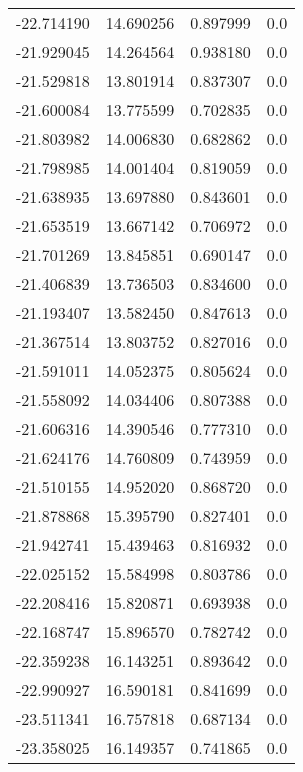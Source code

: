 \begin{tabular}{rrrr}
      -22.714190 &        14.690256 &    0.897999 &   0.0 \\
      -21.929045 &        14.264564 &    0.938180 &   0.0 \\
      -21.529818 &        13.801914 &    0.837307 &   0.0 \\
      -21.600084 &        13.775599 &    0.702835 &   0.0 \\
      -21.803982 &        14.006830 &    0.682862 &   0.0 \\
      -21.798985 &        14.001404 &    0.819059 &   0.0 \\
      -21.638935 &        13.697880 &    0.843601 &   0.0 \\
      -21.653519 &        13.667142 &    0.706972 &   0.0 \\
      -21.701269 &        13.845851 &    0.690147 &   0.0 \\
      -21.406839 &        13.736503 &    0.834600 &   0.0 \\
      -21.193407 &        13.582450 &    0.847613 &   0.0 \\
      -21.367514 &        13.803752 &    0.827016 &   0.0 \\
      -21.591011 &        14.052375 &    0.805624 &   0.0 \\
      -21.558092 &        14.034406 &    0.807388 &   0.0 \\
      -21.606316 &        14.390546 &    0.777310 &   0.0 \\
      -21.624176 &        14.760809 &    0.743959 &   0.0 \\
      -21.510155 &        14.952020 &    0.868720 &   0.0 \\
      -21.878868 &        15.395790 &    0.827401 &   0.0 \\
      -21.942741 &        15.439463 &    0.816932 &   0.0 \\
      -22.025152 &        15.584998 &    0.803786 &   0.0 \\
      -22.208416 &        15.820871 &    0.693938 &   0.0 \\
      -22.168747 &        15.896570 &    0.782742 &   0.0 \\
      -22.359238 &        16.143251 &    0.893642 &   0.0 \\
      -22.990927 &        16.590181 &    0.841699 &   0.0 \\
      -23.511341 &        16.757818 &    0.687134 &   0.0 \\
      -23.358025 &        16.149357 &    0.741865 &   0.0 \\

\end{tabular}
